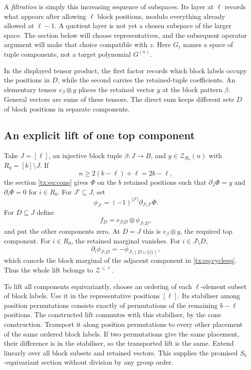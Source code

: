 A \emph{filtration} is simply this increasing sequence of subspaces.
Its layer at $\ell$ records what appears after allowing $\ell$ block
positions, modulo everything already allowed at $\ell-1$. A quotient
layer is not yet a chosen subspace of the larger space. The section
below will choose representatives, and the subsequent operator argument
will make that choice compatible with $z$. Here $G_\ell$ names a
space of tuple components, not a target polynomial $G^{(n)}$.

In the displayed tensor product, the first factor records which block
labels occupy the positions in $D$, while the second carries the
retained-tuple coefficients. An elementary tensor $e_\beta\otimes y$
places the retained vector $y$ at the block pattern $\beta$. General
vectors are sums of these tensors. The direct sum keeps different
sets $D$ of block positions in separate components.

\subsection{An explicit lift of one top component}
Take $J=[\ell]$, an injective block tuple $\beta:J\to B$, and $y\in \mathcal Z_{R_0}(n)$ with $R_0=[b]\setminus J$. If
\[n\ge2(b-\ell)+\ell=2b-\ell,
\]
the section \eqref{tx:eq:cone} gives $\Phi$ on the $b$ retained positions such that $\partial_J\Phi=y$ and $\partial_i\Phi=0$ for $i\in R_0$. For $J'\subseteq J$, set
\[\phi_{J'}=(-1)^{|J'|}\partial_{J\setminus J'}\Phi.
\]
For $D\subseteq J$ define
\[f_D=e_{\beta|D}\otimes\phi_{J\setminus D},
\]
and put the other components zero. At $D=J$ this is $e_\beta\otimes y$, the required top component. For $i\in R_0$, the retained marginal vanishes. For $i\in J\setminus D$,
\[\partial_i\phi_{J\setminus D}=-\phi_{J\setminus(D\cup\{i\})},
\]
which cancels the block marginal of the adjacent component in \eqref{tx:eq:cycleeq}. Thus the whole lift belongs to $\mathcal Z^{\le \ell}$.

To lift all components equivariantly, choose an ordering of each $\ell$-element subset of block labels. Use it in the representative positions $[\ell]$. Its stabiliser among position permutations consists exactly of permutations of the remaining $b-\ell$ positions. The constructed lift commutes with this stabiliser, by the cone construction. Transport it along position permutations to every other placement of the same ordered block labels. If two permutations give the same placement, their difference is in the stabiliser, so the transported lift is the same. Extend linearly over all block subsets and retained vectors. This supplies the promised $S_b$-equivariant section without division by any group order.

